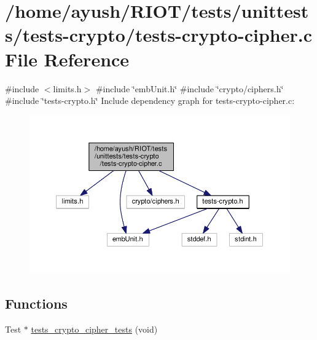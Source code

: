 \hypertarget{tests-crypto-cipher_8c}{}\section{/home/ayush/\+R\+I\+O\+T/tests/unittests/tests-\/crypto/tests-\/crypto-\/cipher.c File Reference}
\label{tests-crypto-cipher_8c}
{\ttfamily \#include $<$limits.\+h$>$}\newline
{\ttfamily \#include \char`\"{}emb\+Unit.\+h\char`\"{}}\newline
{\ttfamily \#include \char`\"{}crypto/ciphers.\+h\char`\"{}}\newline
{\ttfamily \#include \char`\"{}tests-\/crypto.\+h\char`\"{}}\newline
Include dependency graph for tests-\/crypto-\/cipher.c\+:
\nopagebreak
\begin{figure}[H]
\begin{center}
\leavevmode
\includegraphics[width=350pt]{tests-crypto-cipher_8c__incl}
\end{center}
\end{figure}
\subsection*{Functions}
\begin{DoxyCompactItemize}
\item 
Test $\ast$ \hyperlink{group__unittests_ga0da52ebef74d5bf263ce63858f7dea0c}{tests\+\_\+crypto\+\_\+cipher\+\_\+tests} (void)
\end{DoxyCompactItemize}
